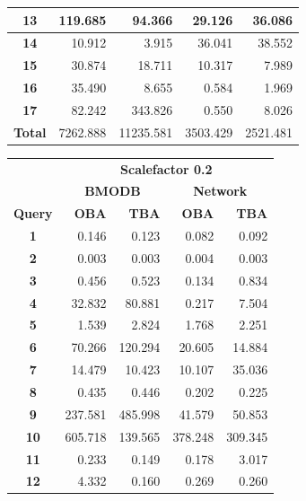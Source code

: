 \documentclass[a4paper]{article}
\begin{document}
\begin{figure}[h]
\begin{minipage}{0.5\linewidth}
\begin{tiny}
\begin{tabular}{|c|r|r|r|r|}
        \hline
        \textbf{13}&119.685&94.366&29.126&36.086\\
        \hline
        \textbf{14}&10.912&3.915&36.041&38.552\\
        \hline
        \textbf{15}&30.874&18.711&10.317&7.989\\
        \hline
        \textbf{16}&35.490&8.655&0.584&1.969\\
        \hline
        \textbf{17}&82.242&343.826&0.550&8.026\\
        \hline
        \textbf{Total}&7262.888&11235.581&3503.429&2521.481\\
        \hline
      \end{tabular}
    \end{tiny}
  \end{minipage}\hfill
  \begin{minipage}{0.5\linewidth}
    \begin{tiny}
      \begin{tabular}{|c|r|r|r|r|}
        \hline
        &\multicolumn{4}{c|}{\textbf{Scalefactor 0.2}}\\
        \cline{2-5}
        &\multicolumn{2}{c|}{\textbf{BMODB}}&\multicolumn{2}{c|}{\textbf{Network}}\\
        \hline
        \textbf{Query}&\textbf{OBA}&\textbf{TBA}&\textbf{OBA}&\textbf{TBA}\\
        \hline
        \textbf{1}&0.146&0.123&0.082&0.092\\
        \hline
        \textbf{2}&0.003&0.003&0.004&0.003\\
        \hline
        \textbf{3}&0.456&0.523&0.134&0.834\\
        \hline
        \textbf{4}&32.832&80.881&0.217&7.504\\
        \hline
        \textbf{5}&1.539&2.824&1.768&2.251\\
        \hline
        \textbf{6}&70.266&120.294&20.605&14.884\\
        \hline
        \textbf{7}&14.479&10.423&10.107&35.036\\
        \hline
        \textbf{8}&0.435&0.446&0.202&0.225\\
        \hline
        \textbf{9}&237.581&485.998&41.579&50.853\\
        \hline
        \textbf{10}&605.718&139.565&378.248&309.345\\
        \hline
        \textbf{11}&0.233&0.149&0.178&3.017\\
        \hline
        \textbf{12}&4.332&0.160&0.269&0.260\\

\end{tabular}
\end{tiny}
\end{minipage}
\end{figure}
\end{document}
